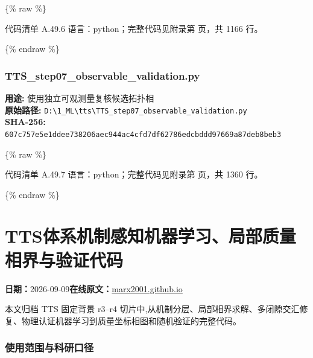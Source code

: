 \documentclass[lang=cn,scheme=chinese,color=blue,device=normal,toc=onecol,math=cm]{elegantbook}
\begin{document}
\{\% raw \%\}\par


\begin{codeindexbox}{代码清单 A.49.6}
语言：python；完整代码见附录第 \pageref{code:49:6} 页，共 1166 行。
\end{codeindexbox}


\{\% endraw \%\}\par


\subsubsection{TTS\_\allowbreak{}step07\_\allowbreak{}observable\_\allowbreak{}validation.py}


\textbf{用途:} 使用独立可观测量复核候选拓扑相\\ \textbf{原始路径:} \texttt{D:\textbackslash{}\allowbreak{}1\_\allowbreak{}ML\textbackslash{}\allowbreak{}tts\textbackslash{}\allowbreak{}TTS\_\allowbreak{}step07\_\allowbreak{}observable\_\allowbreak{}validation.py}\\ \textbf{SHA-256:} \texttt{607c757e5e1ddee738206aec944ac4cfd7df62786edcbddd97669a87deb8beb3}\par


\{\% raw \%\}\par


\begin{codeindexbox}{代码清单 A.49.7}
语言：python；完整代码见附录第 \pageref{code:49:7} 页，共 1360 行。
\end{codeindexbox}


\{\% endraw \%\}\par



\section{TTS体系机制感知机器学习、局部质量相界与验证代码}
\begin{articlemeta}
\textbf{日期：}2026-09-09\hfill\textbf{在线原文：}\href{https://marx2001.github.io/sci-note\_posts/20260909-altermagnetic-tts-mass-code/}{marx2001.github.io}
\end{articlemeta}

本文归档 TTS 固定背景 r3–r4 切片中,从机制分层、局部相界求解、多闭隙交汇修复、物理认证机器学习到质量坐标相图和随机验证的完整代码。\par


\subsubsection{使用范围与科研口径}
\end{document}
